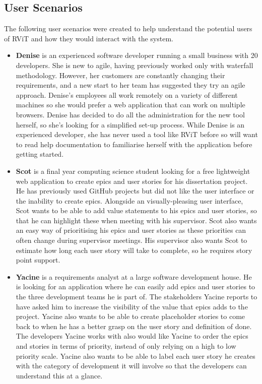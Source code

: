 \documentclass[l4proj.tex]{subfiles}
\begin{document}
\subsection{User Scenarios}
The following user scenarios were created to help understand the potential users of RViT and how they would interact with the system.
\begin{itemize}
    \item \textbf{Denise} is an experienced software developer running a small business with 20 developers. She is new to agile, having previously worked only with waterfall methodology. However, her customers are constantly changing their requirements, and a new start to her team has suggested they try an agile approach. Denise's employees all work remotely on a variety of different machines so she would prefer a web application that can work on multiple browsers. Denise has decided to do all the administration for the new tool herself, so she's looking for a simplified set-up process. While Denise is an experienced developer, she has never used a tool like RViT before so will want to read help documentation to familiarise herself with the application before getting started.\\
    
    \item  \textbf{Scot} is a final year computing science student looking for a free lightweight web application to create epics and user stories for his dissertation project. He has previously used GitHub projects but did not like the user interface or the inability to create epics. Alongside an visually-pleasing  user interface, Scot wants to be able to add value statements to his epics and user stories, so that he can highlight these when meeting with his supervisor. Scot also wants an easy way of prioritising his epics and user stories as these priorities can often change during supervisor meetings. His supervisor also wants Scot to estimate how long each user story will take to complete, so he requires story point support.\\

    \item \textbf{Yacine} is a requirements analyst at a large software development house. He is looking for an application where he can easily add epics and user stories to the three development teams he is part of. The stakeholders Yacine reports to have asked him to increase the visibility of the value that epics adds to the project. Yacine also wants to be able to create placeholder stories to come back to when he has a better grasp on the user story and definition of done. The developers Yacine works with also would like Yacine to order the epics and stories in terms of priority, instead of only relying on a high to low priority scale. Yacine also wants to be able to label each user story he creates with the category of development it will involve so that the developers can understand this at a glance. \\


\end{itemize}
\end{document}
